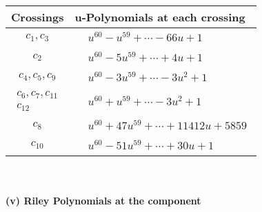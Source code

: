 \documentclass[1p]{elsarticle_modified}
\theoremstyle{definition}
\begin{document}
\begin{tabular}{m{50pt}|m{274pt}}
Crossings & \hspace{64pt}u-Polynomials at each crossing \\
\hline $$\begin{aligned}c_{1},c_{3}\end{aligned}$$&$\begin{aligned}
&u^{60}- u^{59}+\cdots-66 u+1
\end{aligned}$\\
\hline $$\begin{aligned}c_{2}\end{aligned}$$&$\begin{aligned}
&u^{60}-5 u^{59}+\cdots+4 u+1
\end{aligned}$\\
\hline $$\begin{aligned}c_{4},c_{5},c_{9}\end{aligned}$$&$\begin{aligned}
&u^{60}-3 u^{59}+\cdots-3 u^2+1
\end{aligned}$\\
\hline $$\begin{aligned}c_{6},c_{7},c_{11}\\c_{12}\end{aligned}$$&$\begin{aligned}
&u^{60}+u^{59}+\cdots-3 u^2+1
\end{aligned}$\\
\hline $$\begin{aligned}c_{8}\end{aligned}$$&$\begin{aligned}
&u^{60}+47 u^{59}+\cdots+11412 u+5859
\end{aligned}$\\
\hline $$\begin{aligned}c_{10}\end{aligned}$$&$\begin{aligned}
&u^{60}-51 u^{59}+\cdots+30 u+1
\end{aligned}$\\
\hline
\end{tabular}\\~\\
\newpage\renewcommand{\arraystretch}{1}
\flushleft \textbf{(v) Riley Polynomials at the component}\newline \\
\end{document}
